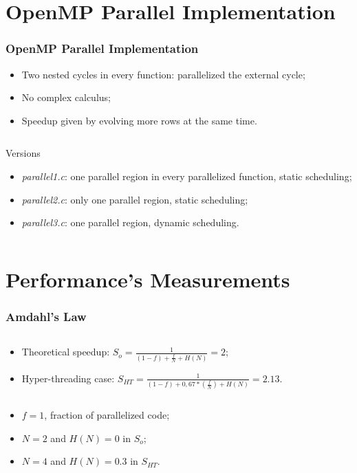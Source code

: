 \documentclass{beamer}
\begin{document}
\section{OpenMP Parallel Implementation}
\begin{frame}
	\frametitle{OpenMP Parallel Implementation}
	\begin{itemize}
				\item Two nested cycles in every function: parallelized the external cycle;
				\item No complex calculus;
				\item Speedup given by evolving more rows at the same time.
	\end{itemize}
	\vfill
	\begin{columns}
		\begin{block}{Versions}
			\begin{itemize}
				\item \emph{parallel1.c}: one parallel region in every parallelized function, static scheduling;
				\item \emph{parallel2.c}: only one parallel region, static scheduling;
				\item \emph{parallel3.c}: one parallel region, dynamic scheduling.
			\end{itemize}
		\end{block}
	\end{columns}
\end{frame}

\section{Performance's Measurements}
\begin{frame}
	\frametitle{Amdahl's Law}
	\begin{columns}
		\column{0.9\textwidth}
		\begin{block}{}
			\begin{itemize}
				\item Theoretical speedup: $S_{o} = \frac{1}{(1-f) + \frac{f}{N} + H(N)} = 2$;
				\item Hyper-threading case: $S_{HT} = \frac{1}{(1-f) + 0,67*(\frac{f}{N}) + H(N)} = 2.13$.
			\end{itemize}
		\end{block}
	\end{columns}
	\vfill
	\begin{itemize}
		\item $f = 1$, fraction of parallelized code;
		\item $N = 2$ and $H(N) = 0$ in $S_{o}$;
		\item $N = 4$ and $H(N) = 0.3$ in $S_{HT}$.
	\end{itemize}
\end{frame}	
\end{document}
